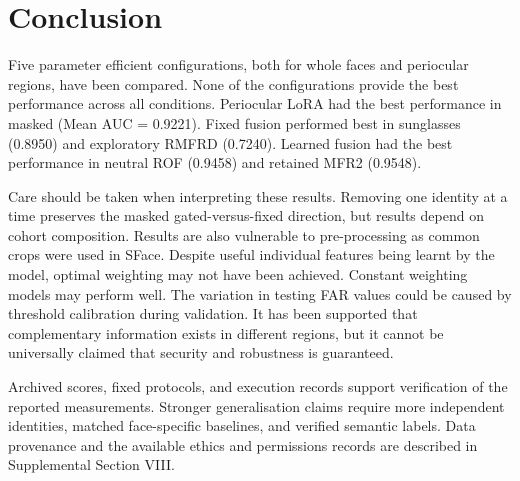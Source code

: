 \documentclass[10pt,lettersize,journal]{IEEEtran}
\begin{document}
\section{Conclusion}
Five parameter efficient configurations, both for whole faces and periocular regions, have been compared. None of the configurations provide the best performance across all conditions. Periocular LoRA had the best performance in masked (Mean AUC = 0.9221). Fixed fusion performed best in sunglasses (0.8950) and exploratory RMFRD (0.7240). Learned fusion had the best performance in neutral ROF (0.9458) and retained MFR2 (0.9548).\par
Care should be taken when interpreting these results. Removing one identity at a time preserves the masked gated-versus-fixed direction, but results depend on cohort composition. Results are also vulnerable to pre-processing as common crops were used in SFace. Despite useful individual features being learnt by the model, optimal weighting may not have been achieved. Constant weighting models may perform well. The variation in testing FAR values could be caused by threshold calibration during validation. It has been supported that complementary information exists in different regions, but it cannot be universally claimed that security and robustness is guaranteed.\par
Archived scores, fixed protocols, and execution records support verification of the reported measurements. Stronger generalisation claims require more independent identities, matched face-specific baselines, and verified semantic labels. Data provenance and the available ethics and permissions records are described in Supplemental Section VIII.\par
\end{document}
